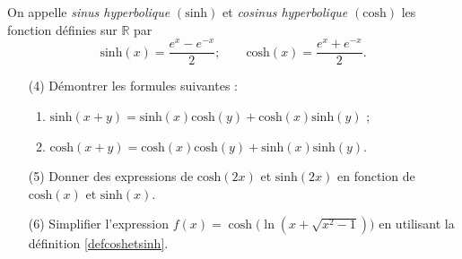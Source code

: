 
\begin{exercice}\label{exostarterST-0015versionpourcorrige}


On appelle \emph{sinus hyperbolique} $(\text{sinh})$ et \emph{cosinus hyperbolique} $(\text{cosh})$ les fonction définies sur $\mathbb{R}$ par 
\begin{equation}\label{defcoshetsinh}
  \text{sinh}(x) = \frac{e^x-e^{-x}}{2} ; \qquad  \text{cosh}(x) = \frac{e^x+e^{-x}}{2}. 
\end{equation}
\begin{enumerate}
\item[(4)] Démontrer les formules suivantes :
\begin{enumerate}
\item $\text{sinh} (x+y)=\text{sinh}(x) \text{cosh}(y)+\text{cosh}(x)\text{sinh}(y)$ ;
\item $\text{cosh} (x+y)=\text{cosh}(x) \text{cosh}(y)+\text{sinh}(x)\text{sinh}(y)$.
\end{enumerate}
\item[(5)] Donner des expressions de $\text{cosh}(2x)$ et $\text{sinh}(2x)$  en fonction de $\text{cosh}(x)$ et $\text{sinh}(x)$.
\item[(6)] Simplifier l'expression $f(x)=\cosh\Big(\ln(x+\sqrt{x^2-1})\Big)$ en utilisant la définition \eqref{defcoshetsinh}.
\end{enumerate}


\end{exercice}
